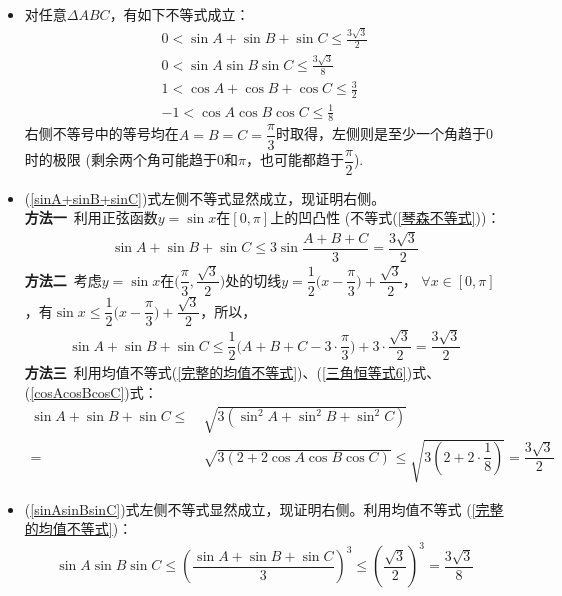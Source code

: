 \begin{itemize}[leftmargin=\inteval{\myitemleftmargin}pt,itemsep=
   \inteval{\myitemitempsep}pt,topsep=\inteval{\myitemtopsep}pt]
\item 对任意$ \Delta ABC $，有如下不等式成立：
\begin{gather}
    0<\sin A +\sin B +\sin C \leq \frac{3\sqrt{3}}{2} \label{sinA+sinB+sinC}\\    
    0<\sin A \sin B \sin C \leq \frac{3\sqrt{3}}{8} \label{sinAsinBsinC}\\
    1<\cos A +\cos B +\cos C \leq \frac{3}{2} \label{cosA+cosB+cosC}\\
    -1<\cos A\cos B\cos C \leq \frac{1}{8} \label{cosAcosBcosC}
\end{gather}
右侧不等号中的等号均在$ A=B=C=\dfrac{\pi}{3} $时取得，左侧则是至少一个角趋于0时的极限
(剩余两个角可能趋于$ 0 $和$ \pi $，也可能都趋于$ \dfrac{\pi}{2} $).

\item (\ref{sinA+sinB+sinC})式左侧不等式显然成立，现证明右侧。\\
\textbf{方法一}\ 利用正弦函数$ y=\sin x $在$ [0,\pi] $上的凹凸性
(不等式(\ref{琴森不等式}))：
\begin{gather*}
    \sin A +\sin B +\sin C \leq 3\sin \dfrac{A+B+C}{3}=\dfrac{3\sqrt{3}}{2}
\end{gather*}
\textbf{方法二}\ 考虑$ y=\sin x $在$ \Big(\dfrac{\pi}{3},\dfrac{\sqrt{3}}{2}
\Big) $处的切线$ y=\dfrac{1}{2}\Big(x-\dfrac{\pi}{3}\Big)+\dfrac{\sqrt{3}}{2} $，
$ \forall x\in [0,\pi] $，有$ \sin x\leq \dfrac{1}{2}\Big(x-\dfrac{\pi}{3}\Big)
+\dfrac{\sqrt{3}}{2} $，所以，
\begin{gather*}
    \sin A +\sin B +\sin C \leq \dfrac{1}{2}\Big(A+B+C-3\cdot\dfrac{\pi}{3}\Big)
    +3\cdot\dfrac{\sqrt{3}}{2}=\dfrac{3\sqrt{3}}{2}
\end{gather*}
\textbf{方法三}\ 利用均值不等式(\ref{完整的均值不等式})、(\ref{三角恒等式6})式、
(\ref{cosAcosBcosC})式：
\begin{align*}
    \sin A +\sin B +\sin C \leq &\ \sqrt{3(\sin^2A+\sin^2B+\sin^2C)} \\
    =&\ \sqrt{3(2+2\cos A\cos B\cos C)}\leq \sqrt{3\left(2+2\cdot 
        \dfrac{1}{8}\right)}=\dfrac{3\sqrt{3}}{2}
\end{align*}

\item (\ref{sinAsinBsinC})式左侧不等式显然成立，现证明右侧。利用均值不等式
(\ref{完整的均值不等式})：
\begin{gather}
    \sin A \sin B \sin C \leq \left(\dfrac{\sin A +\sin B +\sin C}{3} \right)^3
    \leq \left(\dfrac{\sqrt{3}}{2}\right)^3=\dfrac{3\sqrt{3}}{8}
    \label{三个正弦和不等式-小于}
\end{gather}


\end{itemize}

